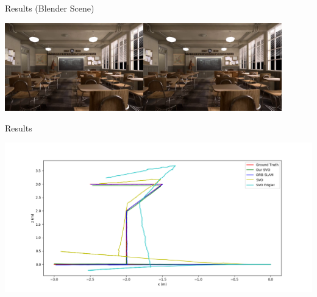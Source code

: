 \documentclass[aspectratio=169]{beamer}
\begin{document}
\begin{frame}{Results (Blender Scene)}
  \begin{center}
    \includegraphics[width=0.9\textwidth]{../img/blender_classroom_scene.png}
  \end{center}
\end{frame}

\begin{frame}{Results}
  \begin{center}
    \includegraphics[height=0.9\textheight]{../img/blender_classroom_simple_comp_top.png}
  \end{center}
\end{frame}
\end{document}
